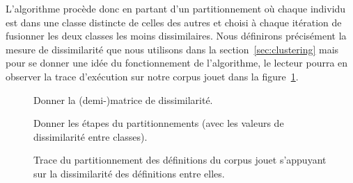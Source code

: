 L'algorithme procède donc en partant d'un partitionnement où chaque
individu est dans une classe distincte de celles des autres et choisi
à chaque itération de fusionner les deux classes les moins
dissimilaires. Nous définirons précisément la mesure de dissimilarité
que nous utilisons dans la section~\ref{sec:clustering} mais pour
se donner une idée du fonctionnement de l'algorithme, le lecteur
pourra en observer la trace d'exécution sur notre corpus jouet
dans la figure~\ref{fig:clustering-jouet}.

\begin{figure}

Donner la (demi-)matrice de dissimilarité.

Donner les étapes du partitionnements (avec les valeurs de dissimilarité entre classes).

\caption{Trace du partitionnement des définitions du corpus jouet s'appuyant sur la dissimilarité
des définitions entre elles.}
\label{fig:clustering-jouet}
\end{figure}

